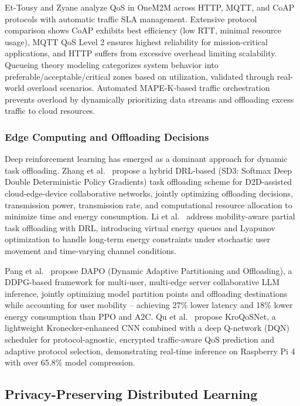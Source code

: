 Et-Tousy and Zyane \cite{EtTousy25LNNS} analyze QoS in OneM2M across HTTP, MQTT, and CoAP protocols with automatic traffic SLA management. Extensive protocol comparison shows CoAP exhibits best efficiency (low RTT, minimal resource usage), MQTT QoS Level 2 ensures highest reliability for mission-critical applications, and HTTP suffers from excessive overhead limiting scalability. Queueing theory modeling categorizes system behavior into preferable/acceptable/critical zones based on utilization, validated through real-world overload scenarios. Automated MAPE-K-based traffic orchestration prevents overload by dynamically prioritizing data streams and offloading excess traffic to cloud resources.

\subsubsection{Edge Computing and Offloading Decisions}

Deep reinforcement learning has emerged as a dominant approach for dynamic task offloading. Zhang et al.\ \cite{Zhang24TMC} propose a hybrid DRL-based (SD3: Softmax Deep Double Deterministic Policy Gradients) task offloading scheme for D2D-assisted cloud-edge-device collaborative networks, jointly optimizing offloading decisions, transmission power, transmission rate, and computational resource allocation to minimize time and energy consumption. Li et al.\ \cite{Li24TVT} address mobility-aware partial task offloading with DRL, introducing virtual energy queues and Lyapunov optimization to handle long-term energy constraints under stochastic user movement and time-varying channel conditions.

Pang et al.\ \cite{Pang25ELEC} propose DAPO (Dynamic Adaptive Partitioning and Offloading), a DDPG-based framework for multi-user, multi-edge server collaborative LLM inference, jointly optimizing model partition points and offloading destinations while accounting for user mobility -- achieving 27\% lower latency and 18\% lower energy consumption than PPO and A2C. Qu et al.\ \cite{Qu25IOT} propose KroQoSNet, a lightweight Kronecker-enhanced CNN combined with a deep Q-network (DQN) scheduler for protocol-agnostic, encrypted traffic-aware QoS prediction and adaptive protocol selection, demonstrating real-time inference on Raspberry Pi 4 with over 65.8\% model compression.

\subsection{Privacy-Preserving Distributed Learning}
\label{subsec:privacy}

